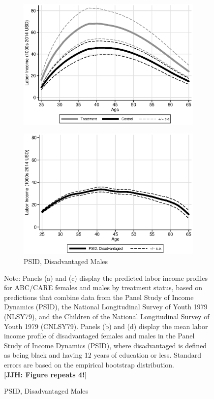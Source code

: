 \begin{figure}
\begin{subfigure}[h]{0.4\textwidth}
		\includegraphics[width=\textwidth]{output/labor_25-60_male_1.eps}
\end{subfigure}%
\begin{subfigure}[h]{0.4\textwidth}
	\centering
	\caption{PSID, Disadvantaged Males} \label{fig:psid1}
		\includegraphics[width=\textwidth]{output/psid_disad_s1.eps}
\end{subfigure}
\footnotesize \justify
Note: Panels (a) and (c) display the predicted labor income profiles for ABC/CARE females and males by treatment status, based on predictions that combine data from the Panel Study of Income Dynamics (PSID), the National Longitudinal Survey of Youth 1979 (NLSY79), and the Children of the National Longitudinal Survey of Youth 1979 (CNLSY79). Panels (b) and (d) display the mean labor income profile of disadvantaged females and males in the Panel Study of Income Dynamics (PSID), where disadvantaged is defined as being black and having 12 years of education or less. Standard errors are based on the empirical bootstrap distribution.\\
\textbf{[JJH: Figure repeats 4!]}
\end{figure}

